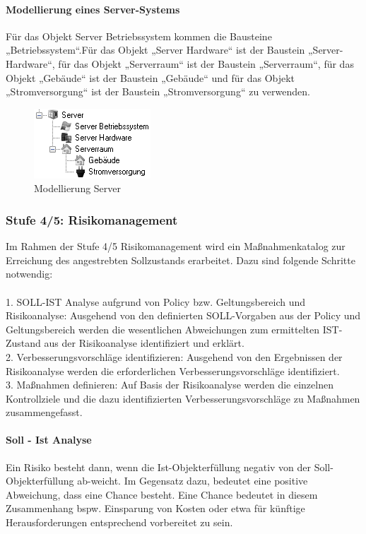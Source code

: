 \paragraph{Modellierung eines Server-Systems}
Für das Objekt Server Betriebssystem kommen die Bausteine „Betriebssystem“.Für das Objekt „Server Hardware“ ist der Baustein „Server-Hardware“, für das Objekt „Serverraum“ ist der Baustein „Serverraum“, für das Objekt „Gebäude“ ist der Baustein „Gebäude“ und für das Objekt „Stromversorgung“ ist der Baustein „Stromversorgung“ zu verwenden.
\begin{figure}[htbp]
	\centering
	\includegraphics[scale =1 ]{images/server.png}
	\caption{Modellierung Server}
	\label{fig:server}
\end{figure}

\subsubsection{Stufe 4/5: Risikomanagement}
Im Rahmen der Stufe 4/5 Risikomanagement wird ein Maßnahmenkatalog zur Erreichung des angestrebten Sollzustands erarbeitet. Dazu sind folgende Schritte notwendig:\\\\
1. SOLL-IST Analyse aufgrund von Policy bzw. Geltungsbereich und Risikoanalyse: Ausgehend von den definierten SOLL-Vorgaben aus der Policy und Geltungsbereich werden die wesentlichen Abweichungen zum ermittelten IST-Zustand aus der Risikoanalyse identifiziert und erklärt.\\
2. Verbesserungsvorschläge identifizieren: Ausgehend von den Ergebnissen der Risikoanalyse werden die erforderlichen Verbesserungsvorschläge identifiziert.\\
3. Maßnahmen definieren: Auf Basis der Risikoanalyse werden die einzelnen Kontrollziele und die dazu identifizierten Verbesserungsvorschläge zu Maßnahmen zusammengefasst.


\paragraph{Soll - Ist Analyse}
Ein Risiko besteht dann, wenn die Ist-Objekterfüllung negativ von der Soll-Objekterfüllung ab-weicht. Im Gegensatz dazu, bedeutet eine positive Abweichung, dass eine Chance besteht. Eine Chance bedeutet in diesem Zusammenhang bspw. Einsparung von Kosten oder etwa für künftige Herausforderungen entsprechend vorbereitet zu sein.

